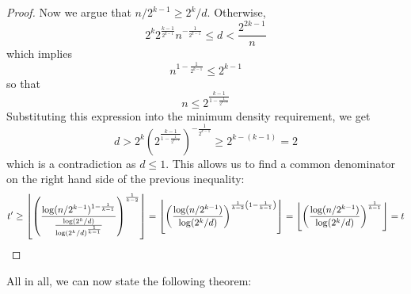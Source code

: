 \begin{lemma}
\begin{proof}
        Now we argue that $n/2^{k-1} \geq 2^{k}/d$.
        Otherwise,
        \[
            2^{k} 2^{\frac{k - 1}{2^{k-1}}} n^{-\frac{1}{2^{k-1}}} \leq d < \frac{2^{2k-1}}{n}
        \]
        which implies
        \[
            n^{1 - \frac{1}{2^{k-1}}} \leq 2^{k-1}
        \]
        so that
        \[
            n \leq 2^{\frac{k-1}{1-\frac{1}{2^{k-1}}}}
        \]
        Substituting this expression into the minimum density requirement, we get
        \[
            d >
            2^{k} \left( 2^{\frac{k-1}{1-\frac{1}{2^{k-1}}}} \right)^{-\frac{1}{2^{k-1}}}  \geq
            2^{k-(k-1)} = 2
        \]
        which is a contradiction as $d \leq 1$.
        This allows us to find a common denominator on the
        right hand side of the previous inequality:
        \[
            t' \geq
            \left\lfloor \left(  \frac{\log (n / 2^{k-1})^{1-\frac{1}{k-1}}}
            {\frac{\log (2^{k} / d)}{\log(2^{k} / d)^{\frac{1}{k-1}}} } \right)^
            {\frac{1}{k-2}} \right\rfloor =
            \left\lfloor \left(  \frac{\log (n / 2^{k-1})}
            {\log (2^{k} / d)} \right)^
            {\frac{1}{k-2}\left( 1 - \frac{1}{k-1} \right)} \right\rfloor =
            \left\lfloor \left(  \frac{\log (n / 2^{k-1})}
            {\log (2^{k} / d)} \right)^
            {\frac{1}{k-1}} \right\rfloor =
            t \qedhere
        \]
    \end{proof}
    

\end{lemma}

All in all, we can now state the following theorem:

